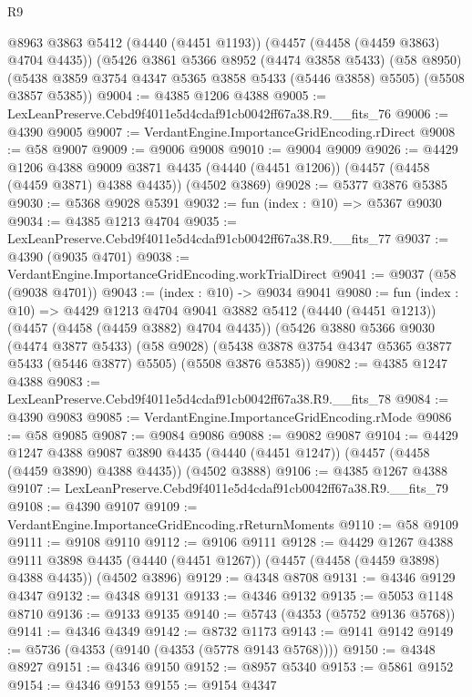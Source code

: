 \begin{lexlean}{R9}
\begin{coremodule}
    @8963
    @3863
    @5412
    (@4440 (@4451 @1193))
    (@4457 (@4458 (@4459 @3863) @4704 @4435))
    (@5426
      @3861
      @5366
      @8952
      (@4474 @3858 @5433)
      (@58 @8950)
      (@5438 @3859 @3754 @4347 @5365 @3858 @5433 (@5446 @3858) @5505)
      (@5508 @3857 @5385))
@9004 := @4385 @1206 @4388
@9005 := LexLeanPreserve.Cebd9f4011e5d4cdaf91cb0042ff67a38.R9.__fits_76
@9006 := @4390 @9005
@9007 := VerdantEngine.ImportanceGridEncoding.rDirect
@9008 := @58 @9007
@9009 := @9006 @9008
@9010 := @9004 @9009
@9026 := @4429
    @1206
    @4388
    @9009
    @3871
    @4435
    (@4440 (@4451 @1206))
    (@4457 (@4458 (@4459 @3871) @4388 @4435))
    (@4502 @3869)
@9028 := @5377 @3876 @5385
@9030 := @5368 @9028 @5391
@9032 := fun (index : @10) => @5367 @9030
@9034 := @4385 @1213 @4704
@9035 := LexLeanPreserve.Cebd9f4011e5d4cdaf91cb0042ff67a38.R9.__fits_77
@9037 := @4390 (@9035 @4701)
@9038 := VerdantEngine.ImportanceGridEncoding.workTrialDirect
@9041 := @9037 (@58 (@9038 @4701))
@9043 := (index : @10) -> @9034 @9041
@9080 := fun (index : @10) =>
  @4429
    @1213
    @4704
    @9041
    @3882
    @5412
    (@4440 (@4451 @1213))
    (@4457 (@4458 (@4459 @3882) @4704 @4435))
    (@5426
      @3880
      @5366
      @9030
      (@4474 @3877 @5433)
      (@58 @9028)
      (@5438 @3878 @3754 @4347 @5365 @3877 @5433 (@5446 @3877) @5505)
      (@5508 @3876 @5385))
@9082 := @4385 @1247 @4388
@9083 := LexLeanPreserve.Cebd9f4011e5d4cdaf91cb0042ff67a38.R9.__fits_78
@9084 := @4390 @9083
@9085 := VerdantEngine.ImportanceGridEncoding.rMode
@9086 := @58 @9085
@9087 := @9084 @9086
@9088 := @9082 @9087
@9104 := @4429
    @1247
    @4388
    @9087
    @3890
    @4435
    (@4440 (@4451 @1247))
    (@4457 (@4458 (@4459 @3890) @4388 @4435))
    (@4502 @3888)
@9106 := @4385 @1267 @4388
@9107 := LexLeanPreserve.Cebd9f4011e5d4cdaf91cb0042ff67a38.R9.__fits_79
@9108 := @4390 @9107
@9109 := VerdantEngine.ImportanceGridEncoding.rReturnMoments
@9110 := @58 @9109
@9111 := @9108 @9110
@9112 := @9106 @9111
@9128 := @4429
    @1267
    @4388
    @9111
    @3898
    @4435
    (@4440 (@4451 @1267))
    (@4457 (@4458 (@4459 @3898) @4388 @4435))
    (@4502 @3896)
@9129 := @4348 @8708
@9131 := @4346 @9129 @4347
@9132 := @4348 @9131
@9133 := @4346 @9132
@9135 := @5053 @1148 @8710
@9136 := @9133 @9135
@9140 := @5743 (@4353 (@5752 @9136 @5768))
@9141 := @4346 @4349
@9142 := @8732 @1173
@9143 := @9141 @9142
@9149 := @5736 (@4353 (@9140 (@4353 (@5778 @9143 @5768))))
@9150 := @4348 @8927
@9151 := @4346 @9150
@9152 := @8957 @5340
@9153 := @5861 @9152
@9154 := @4346 @9153
@9155 := @9154 @4347

\end{coremodule}
\end{lexlean}
